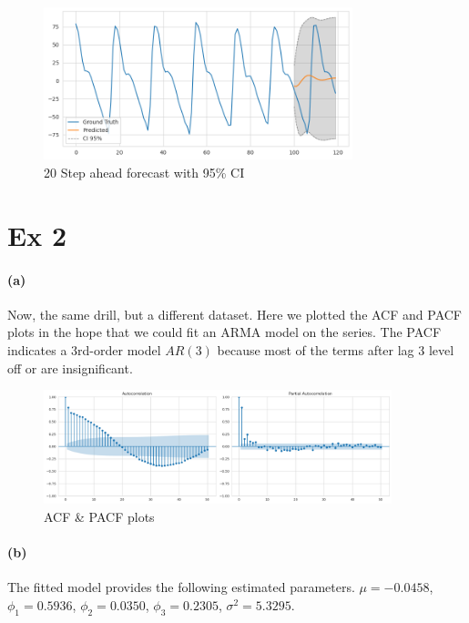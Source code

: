 \documentclass[11pt, letterpaper]{article}
\begin{document}
\begin{figure}[!h]
  \centering
  \includegraphics[width=0.8\textwidth]{plot3.png}
  \captionsetup{justification=centering}
  \caption{20 Step ahead forecast with 95\% CI}
\end{figure}

\newpage
\section{Ex 2}
\paragraph{(a)} Now, the same drill, but a different dataset. Here we plotted the ACF and PACF plots in the hope that we could fit an ARMA model on the series. The PACF indicates a 3rd-order model $AR(3)$ because most of the terms after lag 3 level off or are insignificant.

\begin{figure}[!h]
  \centering
  \includegraphics[width=0.9\textwidth]{plot4.png}
  \captionsetup{justification=centering}
  \caption{ACF & PACF plots}
\end{figure}

\paragraph{(b)} The fitted model provides the following estimated parameters. $\mu=-0.0458$, $\phi_1 = 0.5936$, $\phi_2 = 0.0350$, $\phi_3=0.2305$, $\sigma^2 = 5.3295$.
\end{document}
